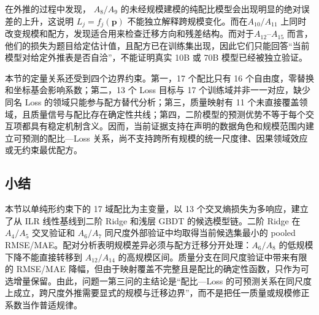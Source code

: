 在外推的过程中发现， $A_8/A_9$ 的未经规模建模的纯配比模型会出现明显的绝对误差的上升，这说明 $L_j=f_j(\boldsymbol p)$ 不能独立解释跨规模变化。而在$A_{10}/A_{11}$ 上同时改变规模和配方，发现适合用来检查迁移方向和残差结构。而对于$A_{12}$--$A_{15}$ 而言，他们的损失为题目给定估计值，且配方已在训练集出现，因此它们只能回答“当前模型对给定外推表是否自洽”，不能证明真实 10B 或 70B 模型已经被独立验证。

本节的定量关系还受到四个边界约束。第一，17 个配比只有 16 个自由度，零替换和坐标基会影响系数；第二，13 个 Loss 目标与 17 个训练域并非一一对应，缺少同名 Loss 的领域只能参与配方替代分析；第三，质量映射有 11 个未直接覆盖领域，且质量信号与配比存在确定性共线；第四，二阶模型的预测优势不等于每个交互项都具有稳定机制含义。因而，当前证据支持在声明的数据角色和规模范围内建立可预测的配比—Loss 关系，尚不支持跨所有规模的统一尺度律、因果领域效应或无约束最优配方。

\subsection{小结}

本节以单纯形约束下的 17 域配比为主变量，以 13 个交叉熵损失为多响应，建立了从 ILR 线性基线到二阶 Ridge 和浅层 GBDT 的候选模型链。二阶 Ridge 在 $A_4/A_5$ 交叉验证和 $A_6/A_7$ 同尺度外部验证中均取得当前候选集最小的 pooled RMSE/MAE。配对分析表明规模差异必须与配方迁移分开处理：$A_6/A_8$ 的低规模下降不能直接转移到 $A_{12}/A_{14}$ 的高规模区间。质量分支在同尺度验证中带来有限的 RMSE/MAE 降幅，但由于映射覆盖不完整且是配比的确定性函数，只作为可选增量保留。由此，问题一第三问的主结论是“配比—Loss 的可预测关系在同尺度上成立，跨尺度外推需要显式的规模与迁移边界”，而不是把任一质量或规模修正系数当作普适规律。
